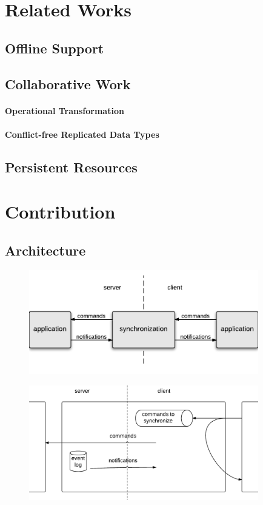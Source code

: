 \documentclass{acm_proc_article-sp}
\begin{document}
\section{Related Works}

\subsection{Offline Support}

\subsection{Collaborative Work}

\paragraph{Operational Transformation}

\paragraph{Conflict-free Replicated Data Types}

\subsection{Persistent Resources}

\section{Contribution}

\subsection{Architecture}

\begin{figure}
\centering
\includegraphics[width=10cm]{arch-overview.pdf}
\label{fig-arch-overview}
\end{figure}

\begin{figure}
\centering
\includegraphics[width=10cm]{arch-detail.pdf}
\end{figure}
\end{document}
